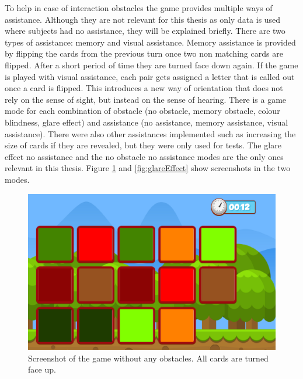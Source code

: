 To help in case of interaction obstacles the game provides multiple ways of assistance. Although they are not relevant for this thesis as only data is used where subjects had no assistance, they will be explained briefly. There are two types of assistance: memory and visual assistance. Memory assistance is provided by flipping the cards from the previous turn once two non matching cards are flipped. After a short period of time they are turned face down again. If the game is played with visual assistance, each pair gets assigned a letter that is called out once a card is flipped. This introduces a new way of orientation that does not rely on the sense of sight, but instead on the sense of hearing. There is a game mode for each combination of obstacle (no obstacle, memory obstacle, colour blindness, glare effect) and assistance (no assistance, memory assistance, visual assistance). There were also other assistances implemented such as increasing the size of cards if they are revealed, but they were only used for tests. The glare effect no assistance and the no obstacle no assistance modes are the only ones relevant in this thesis. Figure \ref{fig:noObstacle} and \ref{fig:glareEffect} show screenshots in the two modes. 

\begin{figure}[H]
	\centering
	\includegraphics[width=13.5cm]{images/noObstTurned.png}
	\caption[Screenshot of the game without any obstacles.]{Screenshot of the game without any obstacles. All cards are turned face up.}
	\label{fig:noObstacle}
\end{figure}

